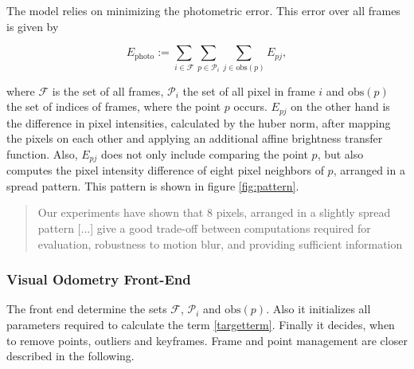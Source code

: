 	The model relies on minimizing the photometric error. This error over all frames is given by
	
	\begin{equation}
	E_{\text{photo}}:= \sum_{i \in \mathcal{F}} \sum_{p \in \mathcal{P}_i} \sum_{j \in \text{obs}\left(p\right)} E_{pj},
	\end{equation}\label{targetterm}
	
	
	where $\mathcal{F}$ is the set of all frames, $\mathcal{P}_i$ the set of all pixel in frame $i$ and $\text{obs}\left(p\right)$
	the set of indices of frames, where the point $p$ occurs. $E_{pj}$ on the other hand is the difference in pixel intensities, calculated 
	by the huber norm, after mapping the pixels on each other and applying an additional affine brightness transfer function. Also, $E_{pj}$ does not 
	only include comparing the point $p$, but also computes the pixel intensity difference of eight pixel neighbors of $p$, arranged in a spread pattern. 
	This pattern is shown in figure \ref{fig:pattern}. 
	
	\begin{quote}
	
Our experiments have shown that 8 pixels, arranged in a
slightly spread pattern [...] give a good trade-off
between computations required for evaluation, robustness
to motion blur, and providing sufficient information

	\end{quote}
	
	
	\subsubsection{Visual Odometry Front-End}
	
	The front end determine the sets $\mathcal{F}$, $\mathcal{P}_i$ and $\text{obs}\left(p\right)$. Also it initializes all parameters 
	required to calculate the term \ref{targetterm}. 
	Finally it decides, when to remove points, outliers and keyframes. Frame and point management are closer described in the following. 
	
